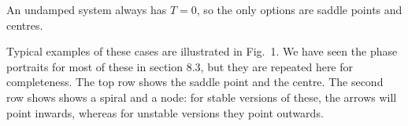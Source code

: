  An undamped system always has $T=0$, so the only options are saddle points 
  and centres. 

  Typical examples of these cases are illustrated in Fig.\ 1. We have seen the 
  phase portraits for most of these in section 8.3, but they are repeated here 
  for completeness. The top row shows the saddle point and the centre. The 
  second row shows shows a spiral and a node: for stable versions of these, the 
  arrows will point inwards, whereas for unstable versions they point outwards. 




